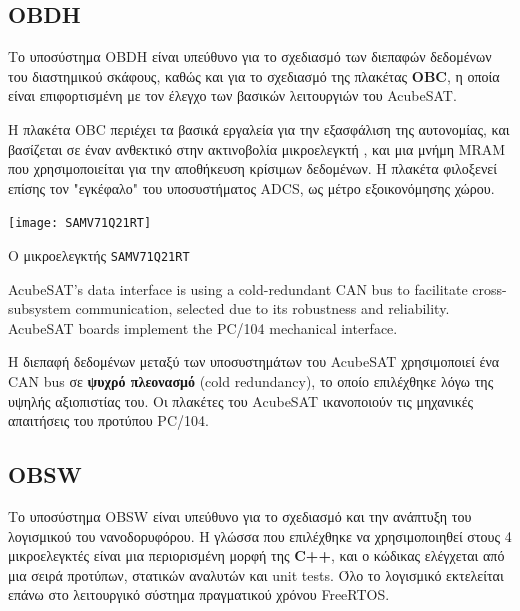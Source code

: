 \documentclass[a4paper,nobib]{tufte-book}
\begin{document}
\subsection{\acf{OBDH}}
\label{sec:obdh}

Το υποσύστημα \ac{OBDH} είναι υπεύθυνο για το σχεδιασμό των διεπαφών δεδομένων του διαστημικού σκάφους, καθώς και για το σχεδιασμό της πλακέτας \textbf{\acf{OBC}}, η οποία είναι επιφορτισμένη με τον έλεγχο των βασικών λειτουργιών του AcubeSAT. \autocite{DDJF_OBDH}

Η πλακέτα \ac{OBC} περιέχει τα βασικά εργαλεία για την εξασφάλιση της αυτονομίας, και βασίζεται σε έναν ανθεκτικό στην ακτινοβολία μικροελεγκτή , και μια μνήμη \acs{MRAM} που χρησιμοποιείται για την αποθήκευση κρίσιμων δεδομένων. Η πλακέτα φιλοξενεί επίσης τον "εγκέφαλο" του υποσυστήματος \ac{ADCS}, ως μέτρο εξοικονόμησης χώρου.

\begin{marginfigure}
	\centering
	\texttt{[image: SAMV71Q21RT]}
	\caption{Ο μικροελεγκτής \texttt{SAMV71Q21RT}}
	\label{fig:samv71}
\end{marginfigure}

AcubeSAT's data interface is using a cold-redundant \ac{CAN} bus to facilitate cross-subsystem communication, selected due to its robustness and reliability. \autocite{bouwmeester_survey_implementation_2017} AcubeSAT boards implement the PC/104 mechanical interface.\autocite{PC104}

Η διεπαφή δεδομένων μεταξύ των υποσυστημάτων του AcubeSAT χρησιμοποιεί ένα \ac{CAN} bus σε \textbf{ψυχρό πλεονασμό} (cold redundancy), το οποίο επιλέχθηκε λόγω της υψηλής αξιοπιστίας του. \autocite{bouwmeester_survey_implementation_2017} Οι πλακέτες του AcubeSAT ικανοποιούν τις μηχανικές απαιτήσεις του προτύπου PC/104. \autocite{PC104}

\subsection{\acf{OBSW}}


Το υποσύστημα \ac{OBSW} είναι υπεύθυνο για το σχεδιασμό και την ανάπτυξη του λογισμικού του νανοδορυφόρου. Η γλώσσα που επιλέχθηκε να χρησιμοποιηθεί στους 4 μικροελεγκτές είναι μια περιορισμένη μορφή της \textbf{C++}, και ο κώδικας ελέγχεται από μια σειρά προτύπων, στατικών αναλυτών και unit tests.\autocite{DDJF_OBSW} Όλο το λογισμικό εκτελείται επάνω στο λειτουργικό σύστημα πραγματικού χρόνου Free\acs{RTOS}.
\end{document}
